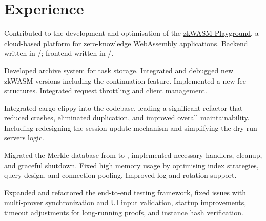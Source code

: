 \documentclass[a4paper]{resume}
\begin{document}
%
\begin{minipage}[t]{0.66\textwidth} %
	\section{Experience}
	\smallsectionspace{}

	\vspace{\topsep}
	\begin{tightitemize}
		\item {
		            Contributed to the development and optimisation of the
		            \href{https://explorer.zkwasmhub.com}{zkWASM Playground}, a cloud-based platform for zero-knowledge
		            WebAssembly applications. Backend written in \rust{}/\actix; frontend written in
		            \react{}/\typescript{}.
		      }
		\item {
		            Developed archive system for task storage. Integrated and debugged new zkWASM versions including the
		            continuation feature. Implemented a new fee structures. Integrated request throttling and \mongo
		            client management.
		      }
		\item {
		            Integrated cargo clippy into the codebase, leading a significant refactor that reduced crashes,
		            eliminated duplication, and improved overall maintainability. Including redesigning the session update
		            mechanism and simplifying the dry-run servers logic.
		      }
		\item {
		            Migrated the Merkle database from \mongo to \rocksdb, implemented necessary handlers, cleanup, and
		            graceful shutdown. Fixed high \mongo memory usage by optimising index strategies, query design, and
		            connection pooling. Improved log and rotation support.
		      }
		\item {
		            Expanded and refactored the end-to-end testing framework, fixed issues with multi-prover synchronization
		            and UI input validation, startup improvements, timeout adjustments for long-running proofs, and instance
		            hash verification.
		      }
	\end{tightitemize}
	\smallsectionspace{}


\end{minipage}
\end{document}
